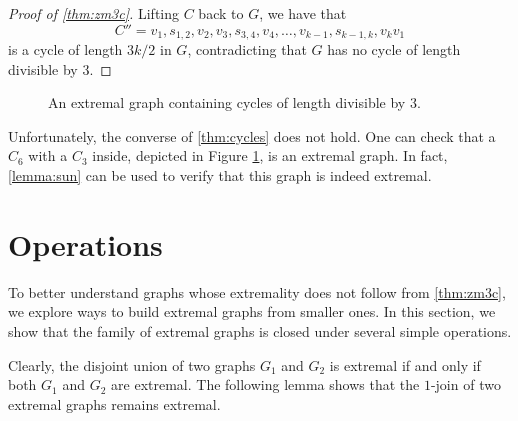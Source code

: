 \documentclass{amsart}
\theoremstyle{definition}
\theoremstyle{remark}
\begin{document}
\begin{proof}[Proof of \cref{thm:zm3c}]
    Lifting $C$ back to $G$, we have that
    \[
        C'' = v_1,s_{1,2},v_2,v_3,s_{3,4},v_4,\dots, v_{k-1}, s_{k-1, k}, v_kv_1
    \]
    is a cycle of length $3k/2$ in $G$, contradicting that $G$ has no cycle of length divisible by $3$.
\end{proof}

\begin{figure}[h!]
    \centering
    \caption{An extremal graph containing cycles of length divisible by $3$.}
    \label{fig: c6 and c3}
\end{figure}

Unfortunately, the converse of \cref{thm:cycles} does not hold. One can check that a $C_6$ with a $C_3$ inside, depicted in Figure \ref{fig: c6 and c3}, is an extremal graph. In fact, \cref{lemma:sun} can be used to verify that this graph is indeed extremal.

\section{Operations}\label{sec-operations}

To better understand graphs whose extremality does not follow from \cref{thm:zm3c}, we explore ways to build extremal graphs from smaller ones. In this section, we show that the family of extremal graphs is closed under several simple operations.

Clearly, the disjoint union of two graphs $G_1$ and $G_2$ is extremal if and only if both $G_1$ and $G_2$ are extremal. The following lemma shows that the $1$-join of two extremal graphs remains extremal.
\end{document}
